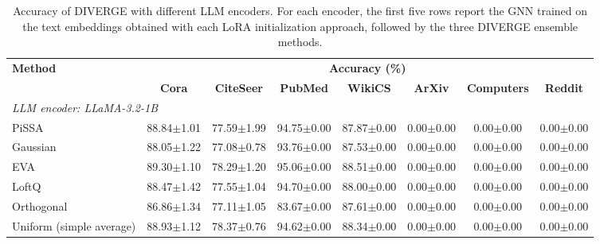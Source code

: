 \documentclass[a4paper,fleqn]{cas-sc}
\begin{document}
\begin{table}[htbp]
\centering
\caption{Accuracy of DIVERGE with different LLM encoders. For each encoder, the first five rows report the GNN trained on the text embeddings obtained with each LoRA initialization approach, followed by the three DIVERGE ensemble methods.}
\label{tab:diverge_llm_encoders}

\small
\setlength{\tabcolsep}{3pt}
\begin{tabular*}{\textwidth}{@{\extracolsep{\fill}} lccccccc @{}}
\toprule
\multirow{2}{*}{\textbf{Method}} & \multicolumn{7}{c}{\textbf{Accuracy (\%)}} \\
\cmidrule(lr){2-8}
 & \textbf{Cora} & \textbf{CiteSeer} & \textbf{PubMed} & \textbf{WikiCS} & \textbf{ArXiv} & \textbf{Computers} & \textbf{Reddit} \\
\midrule
\multicolumn{8}{l}{\textit{LLM encoder: LLaMA-3.2-1B}} \\
\midrule
PiSSA                     & 88.84{\scriptsize$\pm$1.01} & 77.59{\scriptsize$\pm$1.99} & 94.75{\scriptsize$\pm$0.00} & 87.87{\scriptsize$\pm$0.00} & 0.00{\scriptsize$\pm$0.00} & 0.00{\scriptsize$\pm$0.00} & 0.00{\scriptsize$\pm$0.00} \\
Gaussian                  & 88.05{\scriptsize$\pm$1.22} & 77.08{\scriptsize$\pm$0.78} & 93.76{\scriptsize$\pm$0.00} & 87.53{\scriptsize$\pm$0.00} & 0.00{\scriptsize$\pm$0.00} & 0.00{\scriptsize$\pm$0.00} & 0.00{\scriptsize$\pm$0.00} \\
EVA                       & 89.30{\scriptsize$\pm$1.10} & 78.29{\scriptsize$\pm$1.20} & 95.06{\scriptsize$\pm$0.00} & 88.51{\scriptsize$\pm$0.00} & 0.00{\scriptsize$\pm$0.00} & 0.00{\scriptsize$\pm$0.00} & 0.00{\scriptsize$\pm$0.00} \\
LoftQ                     & 88.47{\scriptsize$\pm$1.42} & 77.55{\scriptsize$\pm$1.04} & 94.70{\scriptsize$\pm$0.00} & 88.00{\scriptsize$\pm$0.00} & 0.00{\scriptsize$\pm$0.00} & 0.00{\scriptsize$\pm$0.00} & 0.00{\scriptsize$\pm$0.00} \\
Orthogonal                & 86.86{\scriptsize$\pm$1.34} & 77.11{\scriptsize$\pm$1.05} & 83.67{\scriptsize$\pm$0.00} & 87.61{\scriptsize$\pm$0.00} & 0.00{\scriptsize$\pm$0.00} & 0.00{\scriptsize$\pm$0.00} & 0.00{\scriptsize$\pm$0.00} \\
\cmidrule(lr){1-8}
Uniform (simple average)  & 88.93{\scriptsize$\pm$1.12} & 78.37{\scriptsize$\pm$0.76} & 94.62{\scriptsize$\pm$0.00} & 88.34{\scriptsize$\pm$0.00} & 0.00{\scriptsize$\pm$0.00} & 0.00{\scriptsize$\pm$0.00} & 0.00{\scriptsize$\pm$0.00} \\

\end{tabular*}
\end{table}
\end{document}
